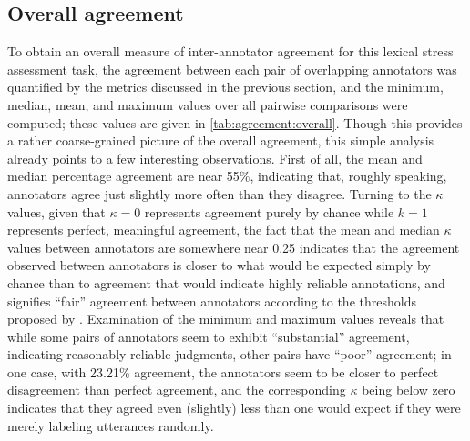 		
		\subsection{Overall agreement}
		\label{sec:agreement:overall}
		
		To obtain an overall measure of inter-annotator agreement for this lexical stress assessment task, the agreement between each pair of overlapping annotators was quantified by the metrics discussed in the previous section, and the minimum, median, mean, and maximum values over all pairwise comparisons were computed; these values are given in \cref{tab:agreement:overall}.
	Though this provides a rather coarse-grained picture of the overall agreement, this simple analysis already points to a few interesting observations. First of all, the mean and median percentage agreement are near 55\%, indicating that, roughly speaking, annotators agree just slightly more often than they disagree.
	Turning to the $\kappa$ values, given that $\kappa = 0$ represents agreement purely by chance while $k = 1$ represents perfect, meaningful agreement, the fact that the mean and median $\kappa$ values between annotators are somewhere near 0.25 indicates that the agreement observed between annotators is closer to what would be expected simply by chance than to agreement that would indicate highly reliable annotations, and signifies ``fair'' agreement between annotators according to the thresholds proposed by \textcite{Landis1977}. Examination of the minimum and maximum values reveals that while some pairs of annotators seem to exhibit ``substantial'' agreement, 
	indicating reasonably reliable judgments, other pairs have ``poor'' agreement; in one case, with 23.21\% agreement, the annotators seem to be closer to perfect disagreement than perfect agreement, and the corresponding $\kappa$ being below zero indicates that they agreed even (slightly) less than one would expect if they were merely labeling utterances randomly. 
	
	
	


